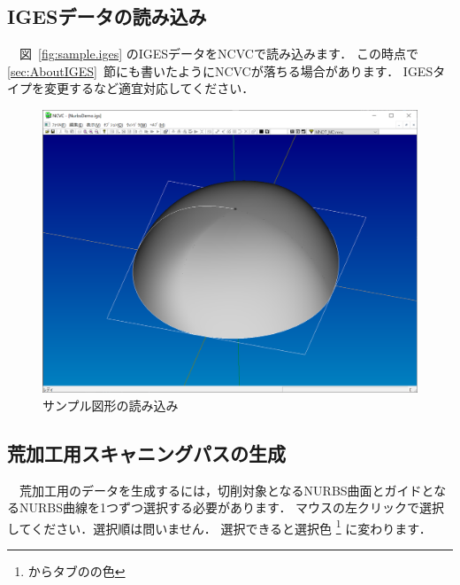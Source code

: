 
\subsection{IGESデータの読み込み}
　図~\ref{fig:sample.iges} のIGESデータをNCVCで読み込みます．
この時点で \ref{sec:AboutIGES}~節にも書いたようにNCVCが落ちる場合があります．
IGESタイプを変更するなど適宜対応してください．

\begin{figure}[H]
\centering
\includegraphics[scale=0.5]{No2/fig/fig21.png}
\caption{サンプル図形の読み込み}
\label{fig:ncvc21}
\end{figure}

\subsection{荒加工用スキャニングパスの生成}
　荒加工用のデータを生成するには，切削対象となるNURBS曲面とガイドとなるNURBS曲線を1つずつ選択する必要があります．
マウスの左クリックで選択してください．選択順は問いません．
選択できると選択色
\footnote{からタブのの色}
に変わります．

